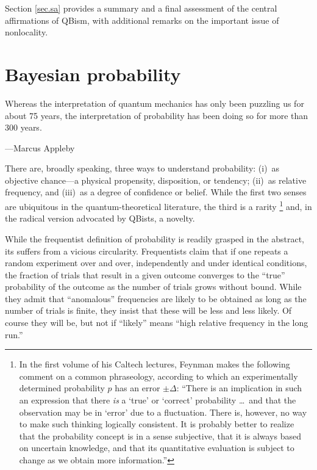 \documentclass[smallextended]{svjour3}
\begin{document}
Section \ref{sec.sa} provides a summary and a final assessment of the central affirmations of QBism, with additional remarks on the important issue of nonlocality. 


\section{Bayesian probability}\label{sec.bp}
{\leftskip\parindent\small Whereas the interpretation of quantum mechanics has only been puzzling us for about 75 years, the interpretation of probability has been doing so for more than 300 years.\par\hfill---Marcus Appleby\cite{Appleby2005}\par}\medskip

\noindent There are, broadly speaking, three ways to understand probability:  (i)~as objective {chance}---a physical {propensity}, {disposition}, or {tendency}; (ii)~as {relative frequency}, and (iii)~as a degree of confidence or belief. While the first two senses are ubiquitous in the quantum-theoretical literature, the third is a rarity%
\footnote{In the first volume of his Caltech lectures,\cite{FLS1} Feynman makes the following comment on a common phraseology, according to which an experimentally determined probability $p$ has an error $\pm\Delta$: ``There is an implication in such an expression that there \emph{is} a `true' or `correct' probability \dots\ and that the observation may be in `error' due to a fluctuation.  There is, however, no way to make such thinking logically consistent.  It is probably better to realize that the probability concept is in a sense subjective, that it is always based on uncertain knowledge, and that its quantitative evaluation is subject to change as we obtain more information.''}
and, in the radical version advocated by QBists, a novelty. 

While the frequentist definition of probability is readily grasped in the abstract, its suffers from a vicious circularity. Frequentists claim that if one repeats a random experiment over and over, independently and under identical conditions, the fraction of trials that result in a given outcome converges to the ``true'' probability of the outcome as the number of trials grows without bound. While they admit that ``anomalous'' frequencies are likely to be obtained as long as the number of trials is finite, they insist that these will be less and less likely. Of course they will be, but not if ``likely'' means ``high relative frequency in the long run.''
\end{document}
